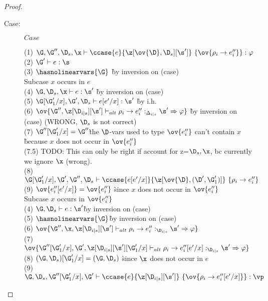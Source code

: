 \begin{proof}
\begin{description}
\item[Case:] $Case$
\begin{tabbing}
    (1) $\G, \G'', \D_s, \x \vdash \ccase{e}{\z[\ov{\D},\D_s][\s']}~\{\ov{\rho_i
    \to e''_i}\} : \varphi$\\
    (2) $\G' \vdash e : \s$\\
    (3) $\hasnolinearvars{\G}$ \` by inversion on (case)\\
    Subcase $x$ occurs in $e$\\
    (4) $\G, \D_s, \x \vdash e : \s'$ \` by inversion on (case)\\
    (5) $\G[\G'_1/x],\G',\D_s \vdash e[e'/x] : \s'$ \` by i.h.\\
    (6) $\ov{\G'',\z[\D_{i|s}][\s'] \vdash_{alt} \rho_i \to e''_i
    :_{\Delta_{i|s}} \s' \Rightarrow \varphi}$ \` by inversion on (case) (WRONG, $\D_s$ is not correct)\\
    (7) $\G''[\G'_1/x]=\G''$\` the $\D$-vars used to type $\ov{e''_i}$ can't contain $x$\\
                            \` because $x$ does not occur in $\ov{e''_i}$\\
    (7.5) TODO: This can only be right if account for z=$\D_s,\x$, bc currently we ignore $\x$ (wrong).\\
    (8) $\G[\G'_1/x],\G',\G'',\D_s \vdash \ccase{e[e'/x]}{\z[\ov{\D},(\D',\G'_1)]}~\{\rho_i \to e''_i\}$\\
    (9) $\ov{e''_i[e'/x]} = \ov{e''_i}$ \` since $x$ does not occur in $\ov{e''_i}$\\
    Subcase $x$ occurs in $\ov{e''_i}$\\
    (4) $\G,\D_s \vdash e : \s'$\` by inversion on (case)\\
    (5) $\hasnolinearvars{\G}$\` by inversion on (case)\\
    (6) $\ov{\G'',\x,\z[\D_{i|s}][\s'] \vdash_{alt} \rho_i \to e''_i :_{\D_{i|s}} \s' \Rightarrow \varphi}$\\
    (7) $\ov{\G''[\G'_1/x],\G',\z[\D_{i|s}][\s'][\G'_1/x] \vdash_{alt} \rho_i \to e''_i[e'/x] :_{\D_{i|s}} \s' \Rightarrow \varphi}$\\
    (8) $(\G,\D_s)[\G'_1/x] = (\G,\D_s)$ \` since $\x$ does not occur in $e$\\
    (9) $\G,\D_s,\G''[\G'_1/x],\G' \vdash \ccase{e}{\z[\D_{i|s}][\s']}~\{\ov{\rho_i \to e''_i[e'/x]}\} : \vp$\\

\end{tabbing}

\end{description}

\end{proof}

